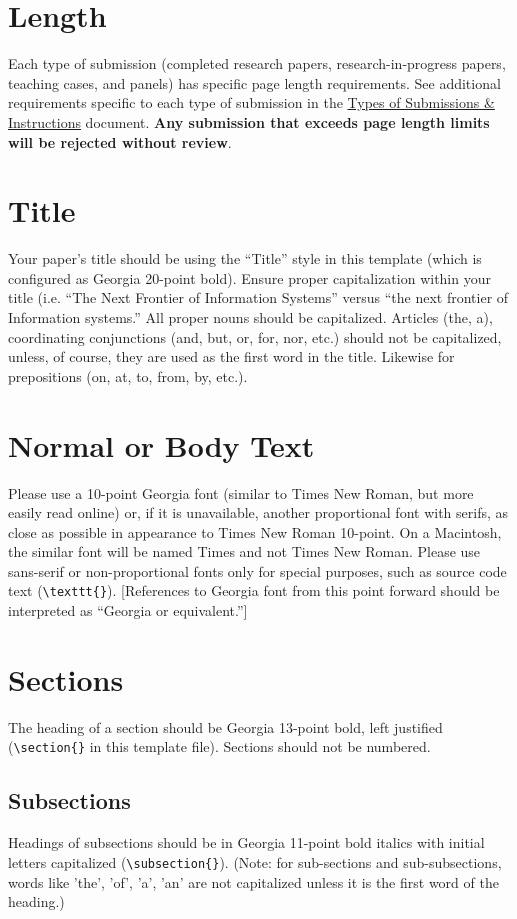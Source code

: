 \documentclass{icis}
\begin{document}
\section{Length}
Each type of submission (completed research papers, research-in-progress papers,
teaching cases, and panels) has specific page length requirements. See
additional requirements specific to each type of submission in the \href{https://icis2024.aisconferences.org/submissions/types-of-submissions/}{Types of Submissions \& Instructions} document. \textbf{Any submission that
exceeds page length limits will be rejected without review}.

\section{Title}
Your paper’s title should be using the “Title” style in this template (which is configured as Georgia 20-point bold). Ensure proper capitalization within your title (i.e. “The Next Frontier of Information Systems” versus “the next frontier of Information systems.” 
All proper nouns should be capitalized. Articles (the, a), coordinating conjunctions (and, but, or, for, nor, etc.) should not be capitalized, unless, of course, they are used as the first word in the title. Likewise for prepositions (on, at, to, from, by, etc.).

\section{Normal or Body Text}
Please use a 10-point Georgia font (similar to Times New Roman, but more easily
read online) or, if it is unavailable, another proportional font with serifs, as
close as possible in appearance to Times New Roman 10-point. On a Macintosh, the
similar font will be named Times and not Times New Roman. Please use sans-serif
or non-proportional fonts only for special purposes, such as source code text
(\texttt{\textbackslash texttt\{\}}). [References to Georgia font from this
point forward should be interpreted as ``Georgia or equivalent.'']

\section{Sections}
The heading of a section should be Georgia 13-point bold, left justified
(\texttt{\textbackslash section\{\}} in this template file).  Sections should not be numbered.

\subsection{Subsections}
Headings of subsections should be in Georgia 11-point bold italics with initial
letters capitalized (\texttt{\textbackslash subsection\{\}}). (Note: for
sub-sections and sub-subsections, words like 'the', 'of', 'a', 'an' are not
capitalized unless it is the first word of the heading.)
\end{document}
